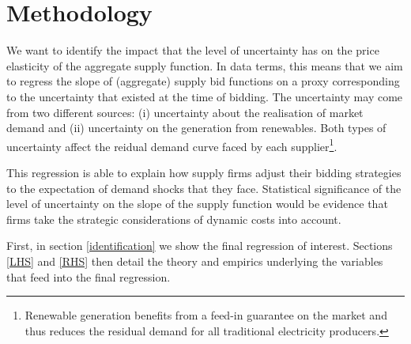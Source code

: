 \section{Methodology}
\label{newapproach}
We want to identify the impact that the level 
of 
uncertainty has on the price elasticity of the aggregate supply function. In data terms, this means that we aim to regress the slope of (aggregate) supply bid functions on a proxy corresponding to the uncertainty that existed at the time of bidding. The uncertainty may come from two different sources: (i) uncertainty about the realisation of market demand and (ii) uncertainty on the generation from renewables. 
Both types of uncertainty affect the reidual demand curve faced by each supplier\footnote{Renewable generation benefits from a feed-in guarantee on the market and thus reduces the residual demand for all traditional electricity producers.}.

This regression is able to explain how supply firms adjust their bidding strategies to the expectation of demand shocks that they face. Statistical significance of the level of uncertainty on the slope of the supply function would be evidence that firms take the strategic considerations of dynamic costs into account. 


\label{strat}

First, in section \ref{identification} we show the final regression of interest. Sections \ref{LHS} and \ref{RHS} then detail the theory and empirics underlying the variables that feed into the final regression. 

